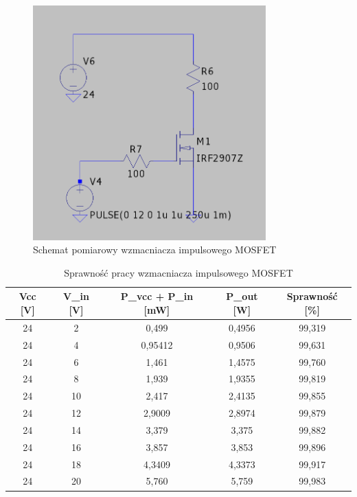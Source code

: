 \documentclass[11pt]{article}
\begin{document}
\begin{figure}[H]
\centering
\includegraphics[width=0.8\textwidth]{aun1_impulsowy_mosfet.png}
\caption{Schemat pomiarowy wzmacniacza impulsowego MOSFET}
\end{figure}

\begin{table}[H]
\centering
\begin{tabular}{|c|c|c|c|c|}
\hline
\textbf{Vcc [V]} & \textbf{V\_in [V]} & \textbf{P\_vcc + P\_in [mW]} & \textbf{P\_out [W]} & \textbf{Sprawność [\%]} \\
\hline
24 & 2  & 0{,}499    & 0{,}4956   & 99{,}319 \\
\hline
24 & 4  & 0{,}95412  & 0{,}9506   & 99{,}631 \\
\hline
24 & 6  & 1{,}461    & 1{,}4575   & 99{,}760 \\
\hline
24 & 8  & 1{,}939    & 1{,}9355   & 99{,}819 \\
\hline
24 & 10 & 2{,}417    & 2{,}4135   & 99{,}855 \\
\hline
24 & 12 & 2{,}9009   & 2{,}8974   & 99{,}879 \\
\hline
24 & 14 & 3{,}379    & 3{,}375    & 99{,}882 \\
\hline
24 & 16 & 3{,}857    & 3{,}853    & 99{,}896 \\
\hline
24 & 18 & 4{,}3409   & 4{,}3373   & 99{,}917 \\
\hline
24 & 20 & 5{,}760    & 5{,}759    & 99{,}983 \\
\hline
\end{tabular}
\caption{Sprawność pracy wzmacniacza impulsowego MOSFET}
\end{table}
\end{document}
